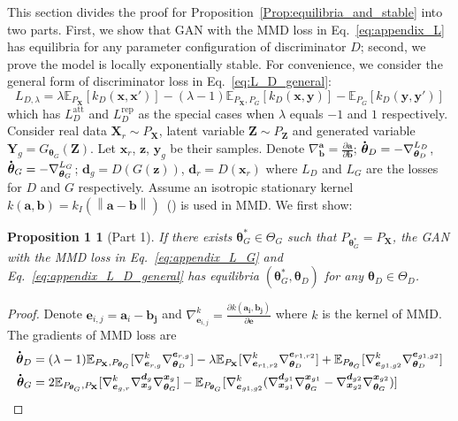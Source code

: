 \documentclass{article} %
\theoremstyle{plain}
\newtheorem*{proposition 1*}{Proposition 1}
\newcommand\norm[1]{\left\lVert#1\right\rVert}
\newcommand{\set}[1]{\mathbb{#1}}  %
\newcommand{\rdv}[1]{\mathbf{#1}}  %
\newcommand*{\dt}[1]{%
	\accentset{\mbox{\large\bfseries .}}{#1}}
\begin{document}
\begin{appendices}
This section divides the proof for Proposition~\ref{Prop:equilibria_and_stable} into two parts. First, we show that GAN with the MMD loss in Eq.~\ref{eq:appendix_L} has equilibria for any parameter configuration of discriminator \(D\); second, we prove the model is locally exponentially stable. For convenience, we consider the general form of discriminator loss in Eq.~\ref{eq:L_D_general}:
\begin{equation}\label{eq:appendix_L_D_general}
L_{D,\lambda}=\lambda\set{E}_{P_{\rdv{X}}}[k_D(\bm{x},\bm{x}')] -(\lambda-1)\set{E}_{P_{\rdv{X}},P_{G}}[k_D(\bm{x},\bm{y})]-\set{E}_{P_G}[k_D(\bm{y},\bm{y}')]
\end{equation}
which has \(L_D^{\text{att}}\) and \(L_D^{\text{rep}}\) as the special cases when \(\lambda\) equals \(-1\) and \(1\) respectively. Consider real data \(\rdv{X}_r\sim P_{\rdv{X}}\), latent variable \(\rdv{Z}\sim P_{\rdv{Z}}\) and generated variable \(\rdv{Y}_g=G_{\bm{\theta}_G}(\rdv{Z})\). Let \(\bm{x}_r\), \(\bm{z}\), \(\bm{y}_g\) be their samples. Denote \(\nabla_{\bm{b}}^{\bm{a}}=\frac{\partial\bm{a}}{\partial\bm{b}}\); \(\dt{\bm{\theta}}_D=-\nabla_{\bm{\theta}_D}^{L_D}\), \(\dt{\bm{\theta}}_G=-\nabla_{\bm{\theta}_G}^{L_G}\); \(\bm{d}_g=D(G(\bm{z}))\), \(\bm{d}_r=D(\bm{x}_r)\) where \(L_D\) and \(L_G\) are the losses for \(D\) and \(G\) respectively. Assume an isotropic stationary kernel \(k(\bm{a},\bm{b})=k_I(\norm{\bm{a}-\bm{b}})\)~(\cite{class_kernel}) is used in MMD. We first show:
\begin{proposition 1*}[Part 1]\label{Prop:equilibria}
	If there exists \(\bm{\theta}_G^*\in\Theta_G\) such that \(P_{\bm{\theta}_G^*}=P_{\rdv{X}}\), the GAN with the MMD loss in Eq.~\ref{eq:appendix_L_G} and Eq.~\ref{eq:appendix_L_D_general} has equilibria \((\bm{\theta}_G^*, \bm{\theta}_D)\) for any \(\bm{\theta}_D\in\Theta_D\).
\end{proposition 1*}
\begin{proof}
	Denote \(\bm{e}_{i,j}=\bm{a}_i-\bm{b_j}\) and \(\nabla_{\bm{e}_{i,j}}^k=\frac{\partial k(\bm{a_i},\bm{b_j})}{\partial\bm{e}}\) where \(k\) is the kernel of MMD. The gradients of MMD loss are
	\begin{subequations}\label{Eq:dot_theta}
		\begin{align}
			\dt{\bm{\theta}}_D &= (\lambda-1)\set{E}_{P_{\rdv{X}},P_{\bm{\theta}_G}}[\nabla_{\bm{e}_{r,g}}^k\nabla_{\bm{\theta}_D}^{\bm{e}_{r,g}}] -\lambda\set{E}_{P_{\rdv{X}}}[\nabla_{\bm{e}_{r1,r2}}^k\nabla_{\bm{\theta}_D}^{\bm{e}_{r1,r2}}] + 
			\set{E}_{P_{\bm{\theta}_G}}[\nabla_{\bm{e}_{g1,g2}}^k\nabla_{\bm{\theta}_D}^{\bm{e}_{g1,g2}}] \label{Eq:dot_theta_D}\\
			\dt{\bm{\theta}}_G &=
			2\set{E}_{P_{\bm{\theta}_G},P_{\rdv{X}}}[\nabla_{\bm{e}_{g,r}}^k\nabla_{\bm{x}_{g}}^{\bm{d}_{g}}\nabla_{\bm{\theta}_{G}}^{\bm{x}_{g}}] \label{Eq:dot_theta_G} -\set{E}_{P_{\bm{\theta}_G}}[\nabla_{\bm{e}_{g1,g2}}^k(\nabla_{\bm{x}_{g1}}^{\bm{d}_{g1}}\nabla_{\bm{\theta}_{G}}^{\bm{x}_{g1}}-\nabla_{\bm{x}_{g2}}^{\bm{d}_{g2}}\nabla_{\bm{\theta}_{G}}^{\bm{x}_{g2}})]
		\end{align}
	\end{subequations}


\end{proof}
\end{appendices}
\end{document}
